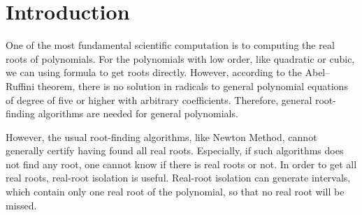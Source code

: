 \section{Introduction}

One of the most fundamental scientific computation is to computing the real
roots of polynomials. For the polynomials with low order, like quadratic or
cubic, we can using formula to get roots directly. However, according to the 
Abel–Ruffini theorem\cite{Abel-Ruffini}, there is no solution in radicals to general 
polynomial equations of degree of five or higher with arbitrary coefficients. 
Therefore, general root-finding algorithms are needed for general polynomials.

However, the usual root-finding algorithms, like Newton Method, cannot generally
certify having found all real roots. Especially, if such algorithms does not
find any root, one cannot know if there is real roots or not. In order to get
all real roots, real-root isolation is useful. Real-root isolation can generate
intervals, which contain only one real root of the polynomial, so that no real
root will be missed.
